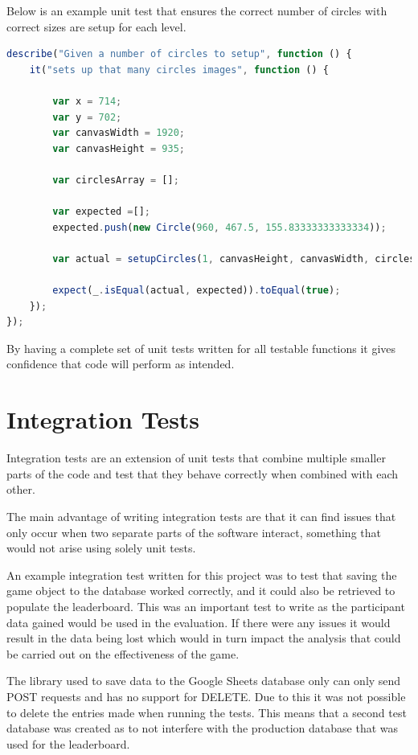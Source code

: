 \documentclass[12pt,a4paper]{report}
\begin{document}
Below is an example unit test that ensures the correct number of circles with correct sizes are setup for each level. 

\begin{minipage}{\linewidth}
\begin{lstlisting}[language=JavaScript]
describe("Given a number of circles to setup", function () {
    it("sets up that many circles images", function () {

        var x = 714;
        var y = 702;
        var canvasWidth = 1920;
        var canvasHeight = 935;

        var circlesArray = [];

        var expected =[];
        expected.push(new Circle(960, 467.5, 155.83333333333334));

        var actual = setupCircles(1, canvasHeight, canvasWidth, circlesArray);

        expect(_.isEqual(actual, expected)).toEqual(true);
    });
});
\end{lstlisting}
\end{minipage}

By having a complete set of unit tests written for all testable functions it gives confidence that code will perform as intended.

\section{Integration Tests}
Integration tests are an extension of unit tests that combine multiple smaller parts of the code and test that they behave correctly when combined with each other. 

The main advantage of writing integration tests are that it can find issues that only occur when two separate parts of the software interact, something that would not arise using solely unit tests. 

An example integration test written for this project was to test that saving the game object to the database worked correctly, and it could also be retrieved to populate the leaderboard. This was an important test to write as the participant data gained would be used in the evaluation. If there were any issues it would result in the data being lost which would in turn impact the analysis that could be carried out on the effectiveness of the game. 

The library used to save data to the Google Sheets database only can only send POST requests and has no support for DELETE. Due to this it was not possible to delete the entries made when running the tests. This means that a second test database was created as to not interfere with the production database that was used for the leaderboard. 
\end{document}

